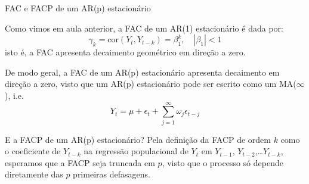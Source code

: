 \documentclass[11pt]{beamer}
\newenvironment{halfwideitemize}{\itemize\addtolength{\itemsep}{0.5em}}{\enditemize}
\begin{document}
\begin{frame}{FAC e FACP de um AR(p) estacionário}
	\begin{halfwideitemize}
		\item Como vimos em aula anterior, a FAC de um AR(1) estacionário é dada por:
		\begin{equation}
			\gamma_k = \text{cor}(Y_t, Y_{t-k}) = \beta_1^k, \quad |\beta_1| < 1
		\end{equation}
		isto é, a FAC apresenta decaimento geométrico em direção a zero.
		\item De modo geral, a FAC de um AR(p) estacionário apresenta {\color{blue}decaimento em direção a zero}, visto que um AR(p) estacionário pode ser escrito como um MA($\infty$), i.e.
		\begin{equation}
			Y_t = \mu + \epsilon_t + \sum_{j=1}^\infty  \omega_j \epsilon_{t- j}
		\end{equation}
		\item E a FACP de um AR(p) estacionário? Pela definição da FACP de ordem $k$ como o coeficiente de $Y_{t-k}$ na regressão populacional de $Y_t$ em $Y_{t-1}$, $Y_{t-2}$,\ldots $Y_{t-k}$, esperamos que a FACP seja {\color{blue} truncada em $p$}, visto que o processo só depende diretamente das $p$ primeiras defasagens.
	\end{halfwideitemize}
\end{frame}
\end{document}
